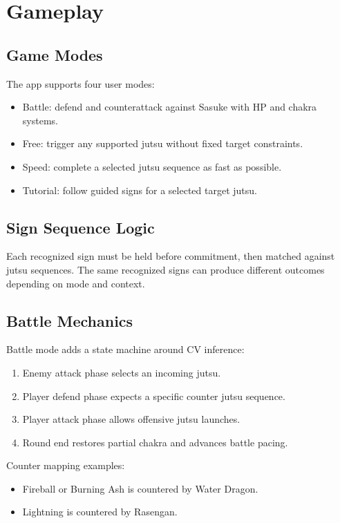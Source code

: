 \chapter{Gameplay}

\section{Game Modes}
The app supports four user modes:
\begin{itemize}[leftmargin=2em]
\item Battle: defend and counterattack against Sasuke with HP and chakra systems.
\item Free: trigger any supported jutsu without fixed target constraints.
\item Speed: complete a selected jutsu sequence as fast as possible.
\item Tutorial: follow guided signs for a selected target jutsu.
\end{itemize}

\section{Sign Sequence Logic}
Each recognized sign must be held before commitment, then matched against jutsu sequences. The same recognized signs can produce different outcomes depending on mode and context.



\section{Battle Mechanics}
Battle mode adds a state machine around CV inference:
\begin{enumerate}[leftmargin=2em]
\item Enemy attack phase selects an incoming jutsu.
\item Player defend phase expects a specific counter jutsu sequence.
\item Player attack phase allows offensive jutsu launches.
\item Round end restores partial chakra and advances battle pacing.
\end{enumerate}

Counter mapping examples:
\begin{itemize}[leftmargin=2em]
\item Fireball or Burning Ash is countered by Water Dragon.
\item Lightning is countered by Rasengan.
\end{itemize}

